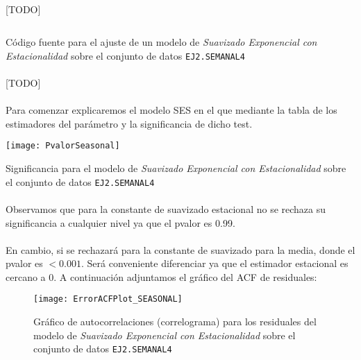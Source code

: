 \documentclass[a4paper, spanish]{article}
\begin{document}
      \paragraph{}
      [TODO]

      \begin{listing}[htb!]
        \centering
        \inputminted{SAS}{./res/code/b-01-esm-seasonal.sas}
        \caption{Código fuente para el ajuste de un modelo de \emph{Suavizado Exponencial con Estacionalidad} sobre el conjunto de datos \texttt{EJ2.SEMANAL4}}
        \label{code:b_seasonal_esm}
      \end{listing}

      \paragraph{}
      [TODO]

      \paragraph{}
      Para comenzar explicaremos el modelo SES en el que mediante la tabla de los estimadores del parámetro y la significancia de dicho test.

      \begin{table}[htb!]
        \centering
        \texttt{[image: PvalorSeasonal]}
        \caption{Significancia para el modelo de \emph{Suavizado Exponencial con Estacionalidad} sobre el conjunto de datos \texttt{EJ2.SEMANAL4}}
        \label{table:b_seasonal_significance}
      \end{table}

      \paragraph{}
      Observamos que para la constante de suavizado estacional no se rechaza su significancia a cualquier nivel ya que el pvalor es 0.99.

      \paragraph{}
      En cambio, si se rechazará para la constante de suavizado para la media, donde el pvalor es $<0.001$. Será conveniente diferenciar ya que el estimador estacional es cercano a 0. A continuación adjuntamos el gráfico del ACF de residuales:

      \begin{figure}[htb!]
        \centering
        \texttt{[image: ErrorACFPlot\_SEASONAL]}
        \caption{Gráfico de autocorrelaciones (correlograma) para los residuales del modelo de \emph{Suavizado Exponencial con Estacionalidad} sobre el conjunto de datos \texttt{EJ2.SEMANAL4}}
        \label{img:b_seasonal_residuals_correlogram}
      \end{figure}
\end{document}
